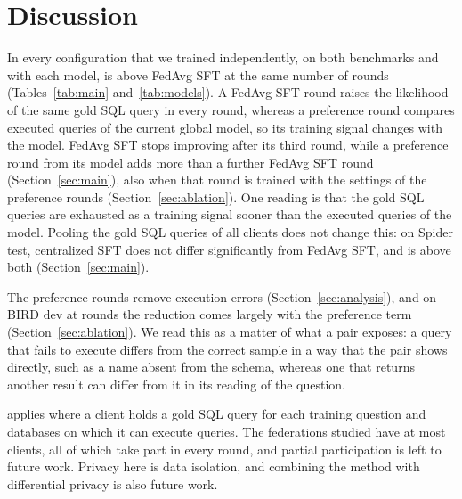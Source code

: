 \section{Discussion}\label{sec:discussion}

In every configuration that we trained independently, on both
benchmarks and with each model, \method{} is above FedAvg SFT at the
same number of rounds (Tables~\ref{tab:main} and~\ref{tab:models}). A
FedAvg SFT round raises the likelihood of the same gold SQL query in
every round, whereas a preference round compares executed queries of
the current global model, so its training signal changes with the
model. FedAvg SFT stops improving after its third round, while a
preference round from its model adds more than a further FedAvg SFT
round (Section~\ref{sec:main}), also when that round is trained with the
settings of the preference rounds (Section~\ref{sec:ablation}). One
reading is that the gold SQL queries are exhausted as a training signal
sooner than the executed queries of the model. Pooling the gold SQL
queries of all clients does not change this: on Spider test,
centralized SFT does not differ significantly from FedAvg SFT, and
\method{} is above both (Section~\ref{sec:main}).

The preference rounds remove execution errors
(Section~\ref{sec:analysis}), and on BIRD dev at 
rounds the reduction comes largely with the preference term
(Section~\ref{sec:ablation}). We read this as a matter of what a pair
exposes: a query that
fails to execute differs from the correct sample in a way that the pair
shows directly, such as a name absent from the schema, whereas one that
returns another result can differ from it in its reading of the
question.

\method{} applies where a client holds a gold SQL query for each
training question and databases on which it can execute queries. The
federations studied have at most 
clients, all of which take part in every round, and partial
participation is left to future work. Privacy here is data isolation,
and combining the method with differential privacy is also future work.

